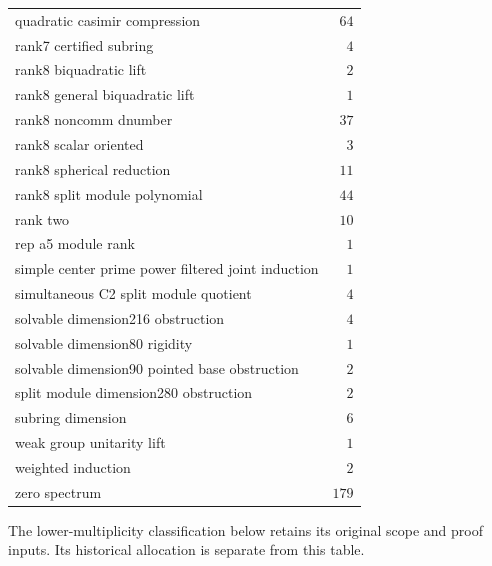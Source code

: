 \begin{center}
\begin{longtable}{@{}p{}r@{}}
quadratic casimir compression & $64$\\
rank7 certified subring & $4$\\
rank8 biquadratic lift & $2$\\
rank8 general biquadratic lift & $1$\\
rank8 noncomm dnumber & $37$\\
rank8 scalar oriented & $3$\\
rank8 spherical reduction & $11$\\
rank8 split module polynomial & $44$\\
rank two & $10$\\
rep a5 module rank & $1$\\
simple center prime power filtered joint induction & $1$\\
simultaneous C2 split module quotient & $4$\\
solvable dimension216 obstruction & $4$\\
solvable dimension80 rigidity & $1$\\
solvable dimension90 pointed base obstruction & $2$\\
split module dimension280 obstruction & $2$\\
subring dimension & $6$\\
weak group unitarity lift & $1$\\
weighted induction & $2$\\
zero spectrum & $179$\\
\bottomrule\end{longtable}\end{center}
The lower-multiplicity classification below retains its original scope and
proof inputs. Its historical allocation is separate from this table.







